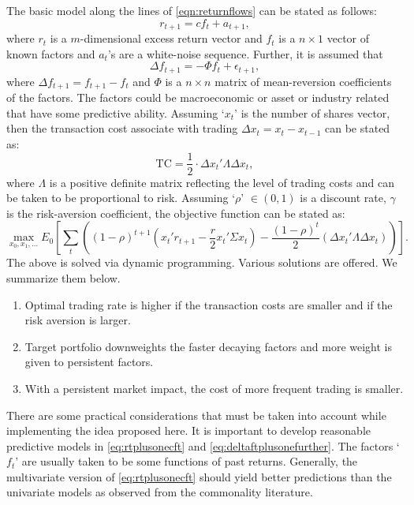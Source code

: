 The basic model along the lines of \eqref{eqn:returnflows} can be stated as follows:
	\begin{equation} \label{eq:rtplusonecft}
	r_{t+1}= c f_t + a_{t+1},
	\end{equation}
where $r_t$ is a $m$-dimensional excess return vector and $f_t$ is a $n \times 1$ vector of known factors and $a_t$'s are a white-noise sequence. Further, it is assumed that
	\begin{equation} \label{eq:deltaftplusonefurther}
	\Delta f_{t+1}= -\Phi f_t + \epsilon_{t+1},
	\end{equation}
where $\Delta f_{t+1}= f_{t+1} - f_t$ and $\Phi$ is a $n \times n$ matrix of mean-reversion coefficients of the factors. The factors could be macroeconomic or asset or industry related that have some predictive ability. Assuming `$x_t$' is the number of shares vector, then the transaction cost associate with trading $\Delta x_t= x_t - x_{t-1}$ can be stated as:
	\begin{equation} \label{eq:tceqhalf}
	\text{TC}= \dfrac{1}{2} \cdot \Delta x_t' \Lambda \Delta x_t,
	\end{equation}
where $\Lambda$ is a positive definite matrix reflecting the level of trading costs and can be taken to be proportional to risk. Assuming `$\rho$' $\in (0,1)$ is a discount rate, $\gamma$ is the risk-aversion coefficient, the objective function can be stated as:
	\begin{equation} \label{eq:objectivefunction}
	\max_{x_0,x_1,\ldots} E_0 \left[ \sum_t \left( (1-\rho)^{t+1} \left( x_t' r_{t+1} - \frac{r}{2} x_t' \Sigma x_t \right) - \dfrac{(1-\rho)^t}{2} (\Delta x_t' \Lambda \Delta x_t) \right) \right].
	\end{equation}
The above is solved via dynamic programming. Various solutions are offered. We summarize them below. 


\begin{enumerate}[--]
\item Optimal trading rate is higher if the transaction costs are smaller and if the risk aversion is larger.
\item Target portfolio downweights the faster decaying factors and more weight is given to persistent factors.
\item With a persistent market impact, the cost of more frequent trading is smaller. 
\end{enumerate}


There are some practical considerations that must be taken into account while implementing the idea proposed here. It is important to develop reasonable predictive models in \eqref{eq:rtplusonecft} and \eqref{eq:deltaftplusonefurther}. The factors `$f_t$' are usually taken to be some functions of past returns. Generally, the multivariate version of \eqref{eq:rtplusonecft} should yield better predictions than the univariate models as observed from the commonality literature. \twomedskip



